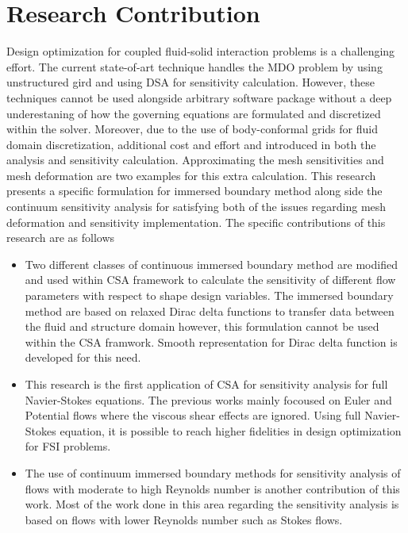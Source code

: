 \section{Research Contribution}
Design optimization for coupled fluid-solid interaction problems is a challenging effort. The current state-of-art technique handles the MDO problem by using unstructured gird and using DSA for sensitivity calculation. However, these techniques cannot be used alongside arbitrary software package without a deep underestaning of how the governing equations are formulated and discretized within the solver. Moreover, due to the use of body-conformal grids for fluid domain discretization, additional cost and effort and introduced in both the analysis and sensitivity calculation. Approximating the mesh sensitivities and mesh deformation are two examples for this extra calculation. This research presents a specific formulation for immersed boundary method along side the continuum sensitivity analysis for satisfying both of the issues regarding mesh deformation and sensitivity implementation. The specific contributions of this research are as follows

\begin{itemize}
	\item Two different classes of continuous immersed boundary method are modified and used within CSA framework to calculate the sensitivity of different flow parameters with respect to shape design variables. The immersed boundary method are based on relaxed Dirac delta functions to transfer data between the fluid and structure domain however, this formulation cannot be used within the CSA framwork. Smooth representation for Dirac delta function is developed for this need.
	\item This research is the first application of CSA for sensitivity analysis for full Navier-Stokes equations. The previous works mainly focoused on Euler and Potential flows where the viscous shear effects are ignored. Using full Navier-Stokes equation, it is possible to reach higher fidelities in design optimization for FSI problems.
	\item The use of continuum immersed boundary methods for sensitivity analysis of flows with moderate to high Reynolds number is another contribution of this work. Most of the work done in this area regarding the sensitivity analysis is based on flows with lower Reynolds number such as Stokes flows.
\end{itemize}
